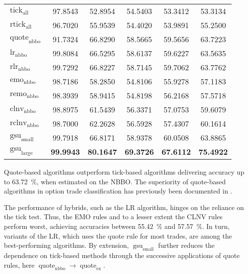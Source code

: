 \begin{table}[ht]
\begin{tabular}{@{}lSSSSS@{}}
        $\operatorname{tick}_{\mathrm{all}}$   & 97.8543           & 52.8954                 & 54.5403 & 53.3412 & 53.3134 \\
        $\operatorname{rtick}_{\mathrm{all}}$  & 96.7020           & 55.9539                 & 54.4020 & 53.9891 & 55.2500 \\ \midrule
        $\operatorname{quote}_{\mathrm{nbbo}}$ & 91.7324           & 66.8290                 & 58.5665 & 59.5656 & 63.7223 \\
        $\operatorname{lr}_{\mathrm{nbbo}}$    & 99.8084           & 66.5295                 & 58.6137 & 59.6227 & 63.5635 \\
        $\operatorname{rlr}_{\mathrm{nbbo}}$   & 99.7292           & 66.8227                 & 58.7145 & 59.7062 & 63.7762 \\
        $\operatorname{emo}_{\mathrm{nbbo}}$   & 98.7186           & 58.2850                 & 54.8106 & 55.9278 & 57.1183 \\
        $\operatorname{remo}_{\mathrm{nbbo}}$  & 98.3939           & 58.9415                 & 54.8198 & 56.2168 & 57.5718 \\
        $\operatorname{clnv}_{\mathrm{nbbo}}$  & 98.8975           & 61.5439                 & 56.3371 & 57.0753 & 59.6079 \\
        $\operatorname{rclnv}_{\mathrm{nbbo}}$ & 98.7000           & 62.2628                 & 56.5928 & 57.4307 & 60.1614 \\ \midrule
        $\operatorname{gsu}_{\mathrm{small}}$  & 99.7918           & 66.8171                 & 58.9378 & 60.0508 & 63.8865 \\
        $\operatorname{gsu}_{\mathrm{large}}$  & \bfseries 99.9943 & \bfseries 80.1647                 & \bfseries 69.3726 & \bfseries 67.6112 & \bfseries 75.4922 \\
        \bottomrule
    \end{tabular}
\end{table}

Quote-based algorithms outperform tick-based algorithms delivering accuracy up to \SI{63.72}{\percent}, when estimated on the \gls{NBBO}. The superiority of quote-based algorithms in option trade classification has previously been documented in \textcites{savickasInferringDirectionOption2003}{grauerOptionTradeClassification2022}.

The performance of hybrids, such as the \gls{LR} algorithm, hinges on the reliance on the tick test. Thus, the \gls{EMO} rules and to a lesser extent the \gls{CLNV} rules perform worst, achieving accuracies between \SI{55.42}{\percent} and \SI{57.57}{\percent}. In turn, variants of the \gls{LR}, which uses the quote rule for most trades, are among the best-performing algorithms. By extension, $\operatorname{gsu}_{\mathrm{small}}$ further reduces the dependence on tick-based methods through the successive applications of quote rules, here $\operatorname{quote}_{\mathrm{nbbo}} \to \operatorname{quote}_{\mathrm{ex}}$.

